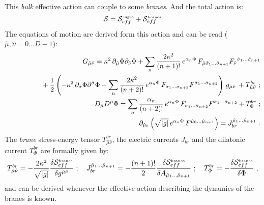 \documentclass[a4paper,12pt]{article}
\def\action{{\cal S}}
\def\hmu{{\hat \mu}}
\def\hnu{{\hat \nu}}
\def\hsigma{{\hat \sigma}}
\begin{document}
This {\it bulk} effective action can couple to some {\it branes}. And the total
action is:
%
\begin{equation}
 \action =
\action_{eff}^{\mbox{\tiny sugra}}
+
\action_{eff}^{\mbox{\tiny branes}}
\end{equation}
%
The equations of motion are derived form this action and can be read
($\hmu,\hnu=0\ldots D-1$):
%
\begin{eqnarray}
\nonumber
&&
G_{\hmu\hnu} = 
\kappa^2\, \partial_\hmu \Phi \partial_\hnu \Phi
+ \sum_{n}
\frac{2\kappa^2}{(n+1)!} \, e^{\alpha_n \Phi}\,
	F_{\hmu\hsigma_1\ldots\hsigma_{n+1}}
	F_{\hnu}{}^{\hsigma_1\ldots\hsigma_{n+1}}
\\
&&	\label{eq:braneRicci}  \rule{1.5cm}{0pt} 
+\frac{1}{2} \left( 
-\kappa^2 \, \partial_\hsigma \Phi \partial^\hsigma \Phi
- \sum_{n}
\frac{2 \kappa^2 }{(n+2)!} \, e^{\alpha_n \Phi}\,
     F_{\hsigma_1\ldots\hsigma_{n+2}}  F^{\hsigma_1\ldots\hsigma_{n+2}}
\right)\, g_{\hmu\hnu}\,
+ T_{\hmu\hnu}^{br}
\ ;
\\
	 \label{eq:branedilaton} 
& &
D_\hmu D^\hmu \Phi = \sum_{n}
\frac{\alpha_n }{(n+2)!}\, e^{\alpha_n \Phi}\,
F_{\hsigma_1\ldots\hsigma_{n+2}} F^{\hsigma_1\ldots\hsigma_{n+2}}
+ T_\Phi^{br}
\ ;
\\
	\label{eq:braneTenseur}
& &
\partial_{\hmu_0} \left( \sqrt{|g|} \, e^{\alpha_n \Phi}\,
F^{\hmu_0\ldots\hmu_{n+1}}
\right) = J^{\hmu_1\ldots\hmu_{n+1}}_{br}
\ .
\end{eqnarray}
% 
%
The {\it brane} stress-energy tensor $T_{\hmu\hnu}^{br}$, the electric currents
$J_{br}$
and the dilatonic current $T_\Phi^{br}$ are formally given by:
%
\begin{eqnarray}
T_{\hmu\hnu}^{br} =  -
\frac{2 \kappa^2}{\sqrt{|g|}}
\frac{\delta \action_{eff}^{\mbox{\tiny branes}}}{\delta g^{\hmu\hnu}}
\ ;
\ \ \
J^{\hmu_1\ldots\hmu_{n+1}}_{br}
=
-\frac{(n+1)!}{2} \frac{\delta \action_{eff}^{\mbox{\tiny branes}}}{
\delta A_{\hmu_1\ldots \hmu_{n+1}}}
\ ;
\ \ \
T_\Phi^{br}
=
- \frac{\delta \action_{eff}^{\mbox{\tiny branes}}}{\delta \Phi}
\ ,
\end{eqnarray}
%
and can be derived whenever the effective action describing the dynamics of the
branes is known.
\end{document}
